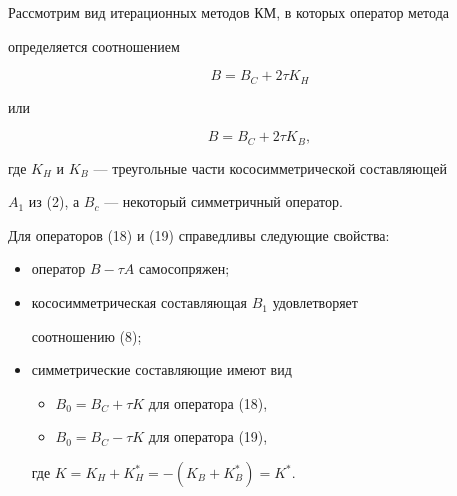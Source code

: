  


Рассмотрим вид итерационных методов КМ, в которых оператор метода 


определяется соотношением 


\begin{equation} 


B=B_C+2\tau K_H 


\end{equation} 


или 


\begin{equation} 


B=B_C+2\tau K_B, 


\end{equation} 


где $K_H$ и $K_B$ --- треугольные части кососимметрической составляющей 


$A_1$ из (2), а $B_c$ --- некоторый симметричный оператор. 


 


Для операторов (18) и (19) справедливы следующие свойства: 


\begin{itemize} 


\item[1)] оператор $B-\tau A$ самосопряжен; 


\item[2)] кососимметрическая составляющая $B_1$ удовлетворяет 


соотношению (8); 


\item[3)] симметрические составляющие имеют вид 


\begin{itemize} 


\item[] $B_0=B_C+\tau K$ для оператора (18), 


\item[] $B_0=B_C-\tau K$ для оператора (19), 


\end{itemize} 


где $K=K_H+K^*_H=-(K_B+K^*_B)=K^*$. 


\end{itemize} 


 



